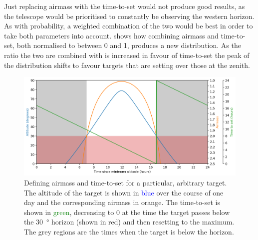 \begin{colsection}
\begin{colsection}
Just replacing airmass with the time-to-set would not produce good results, as the telescope would be prioritised to constantly be observing the western horizon. As with probability, a weighted combination of the two would be best in order to take both parameters into account.  shows how combining airmass and time-to-set, both normalised to between 0 and 1, produces a new distribution. As the ratio the two are combined with is increased in favour of time-to-set the peak of the distribution shifts to favour targets that are setting over those at the zenith.

\begin{figure}[p]
    \begin{center}
        \includegraphics[width=\linewidth]{images/airmass-tts.png}
    \end{center}
    \caption[Defining airmass and time-to-set for a given target]{
        Defining airmass and time-to-set for a particular, arbitrary target. The altitude of the target is shown in \textcolor{Blue}{blue} over the course of one day and the corresponding airmass in \textcolor{BurntOrange}{orange}. The time-to-set is shown in \textcolor{Green}{green}, decreasing to 0 at the time the target passes below the \SI{30}{\degree} horizon (shown in red) and then resetting to the maximum. The grey regions are the times when the target is below the horizon.
    }\label{fig:airmass_tts}
\end{figure}


\end{colsection}
\end{colsection}
